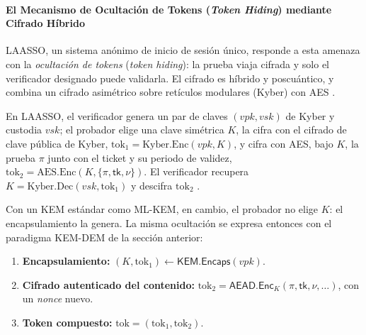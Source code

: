 \paragraph{El Mecanismo de Ocultación de Tokens (\textit{Token Hiding}) mediante Cifrado Híbrido}

LAASSO, un sistema anónimo de inicio de sesión único, responde a esta amenaza con la \textit{ocultación de tokens} (\textit{token hiding}): la prueba viaja cifrada y solo el verificador designado puede validarla. El cifrado es híbrido y poscuántico, y combina un cifrado asimétrico sobre retículos modulares (Kyber) con AES \cite{ma2026laasso}.

En LAASSO, el verificador genera un par de claves $(vpk, vsk)$ de Kyber y custodia $vsk$; el probador elige una clave simétrica $K$, la cifra con el cifrado de clave pública de Kyber, $\text{tok}_1 = \text{Kyber.Enc}(vpk, K)$, y cifra con AES, bajo $K$, la prueba $\pi$ junto con el ticket y su periodo de validez, $\text{tok}_2 = \text{AES.Enc}(K, \{\pi, \mathsf{tk}, \nu\})$. El verificador recupera $K = \text{Kyber.Dec}(vsk, \text{tok}_1)$ y descifra $\text{tok}_2$ \cite{ma2026laasso}.

Con un KEM estándar como ML-KEM, en cambio, el probador no elige $K$: el encapsulamiento la genera. La misma ocultación se expresa entonces con el paradigma KEM-DEM de la sección anterior:
\begin{enumerate}
    \item \textbf{Encapsulamiento:} $(K, \text{tok}_1) \leftarrow \mathsf{KEM.Encaps}(vpk)$.
    \item \textbf{Cifrado autenticado del contenido:} $\text{tok}_2 = \mathsf{AEAD.Enc}_{K}(\pi, \mathsf{tk}, \nu, \dots)$, con un \textit{nonce} nuevo.
    \item \textbf{Token compuesto:} $\text{tok} = (\text{tok}_1, \text{tok}_2)$.
\end{enumerate}

